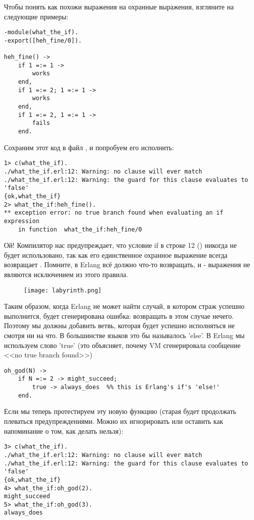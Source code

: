 Чтобы понять как похожи выражения  на охранные выражения, взгляните на следующие примеры:
\begin{lstlisting}[style=erlang]
-module(what_the_if).
-export([heh_fine/0]).
 
heh_fine() ->
    if 1 =:= 1 ->
        works
    end,
    if 1 =:= 2; 1 =:= 1 ->
        works
    end,
    if 1 =:= 2, 1 =:= 1 ->
        fails
    end.
\end{lstlisting}
Сохраним этот код в файл , и попробуем его исполнить:
\begin{lstlisting}[style=repl]
1> c(what_the_if).
./what_the_if.erl:12: Warning: no clause will ever match
./what_the_if.erl:12: Warning: the guard for this clause evaluates to 'false'
{ok,what_the_if}
2> what_the_if:heh_fine().
** exception error: no true branch found when evaluating an if expression
    in function  what_the_if:heh_fine/0
\end{lstlisting}
Ой!
Компилятор нас предупреждает, что условие if в строке 12 () никогда не будет использовано, так как его единственное охранное выражение всегда возвращает .
Помните, в Erlang всё должно что\--то возвращать, и \-- выражения не являются исключением из этого правила. 
\begin{figure}[h!]
    \centering
    \texttt{[image: labyrinth.png]}
\end{figure}
Таким образом, когда Erlang не может найти случай, в котором страж успешно выполнится, будет сгенерирована ошибка: возвращать в этом случае нечего.
Поэтому мы должны добавить ветвь, которая будет успешно исполняться не смотря ни на что.
В большинстве языков это бы называлось 'else'.
В Erlang мы используем слово 'true' (это объясняет, почему VM сгенерировала сообщение <<no true branch found>>)
\begin{lstlisting}[style=erlang]
oh_god(N) ->
    if N =:= 2 -> might_succeed;
        true -> always_does  %% this is Erlang's if's 'else!'
    end.
\end{lstlisting}

Если мы теперь протестируем эту новую функцию (старая будет продолжать плеваться предупреждениями.
Можно их игнорировать или оставить как напоминание о том, как делать нельзя):
\begin{lstlisting}[style=erlang]
3> c(what_the_if).
./what_the_if.erl:12: Warning: no clause will ever match
./what_the_if.erl:12: Warning: the guard for this clause evaluates to 'false'
{ok,what_the_if}
4> what_the_if:oh_god(2).
might_succeed
5> what_the_if:oh_god(3).
always_does
\end{lstlisting}

